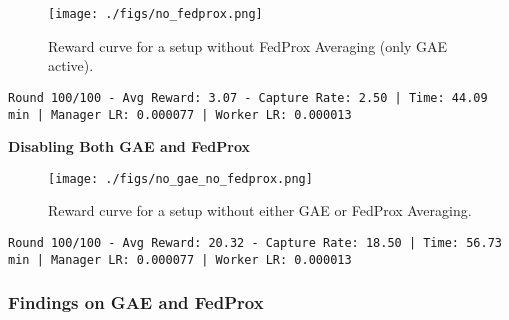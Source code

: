 \documentclass[12pt,a4paper,twoside,openany]{book}
\begin{document}
\begin{figure}[H]
\centering
\texttt{[image: ./figs/no\_fedprox.png]}
\captionsetup{font=small}
\caption{Reward curve for a setup without FedProx Averaging (only GAE active).}
\label{fig:no_fedprox}
\end{figure}

\begin{lstlisting}
Round 100/100 - Avg Reward: 3.07 - Capture Rate: 2.50 | Time: 44.09 min | Manager LR: 0.000077 | Worker LR: 0.000013 
\end{lstlisting}

\textbf{Disabling Both GAE and FedProx}

\begin{figure}[H]
\centering
\texttt{[image: ./figs/no\_gae\_no\_fedprox.png]}
\captionsetup{font=small}
\caption{Reward curve for a setup without either GAE or FedProx Averaging.}
\label{fig:no_gae_no_fedprox}
\end{figure}

\begin{lstlisting}
Round 100/100 - Avg Reward: 20.32 - Capture Rate: 18.50 | Time: 56.73 min | Manager LR: 0.000077 | Worker LR: 0.000013  
\end{lstlisting}

\subsubsection{Findings on GAE and FedProx}
\end{document}
